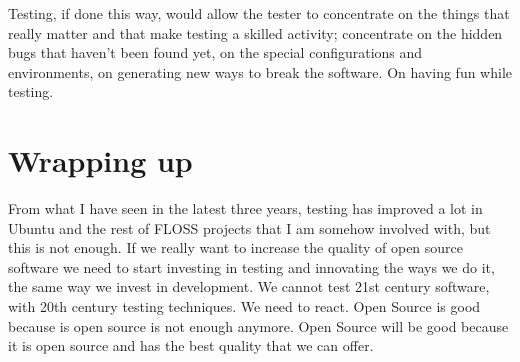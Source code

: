Testing, if done this way, would allow the tester to concentrate on the things that really matter and that make testing a skilled activity; concentrate on the hidden bugs that haven't been found yet, on the special configurations and environments, on generating new ways to break the software. On having fun while testing.

\section*{Wrapping up}

From what I have seen in the latest three years, testing has improved a lot in Ubuntu and the rest of FLOSS projects that I am somehow involved with, but this is not enough. If we really want to increase the quality of open source software we need to start investing in testing and innovating the ways we do it, the same way we invest in development. We cannot test 21st century software, with 20th century testing techniques. We need to react. Open Source is good because is open source is not enough anymore. Open Source will be good because it is open source and has the best quality that we can offer.
